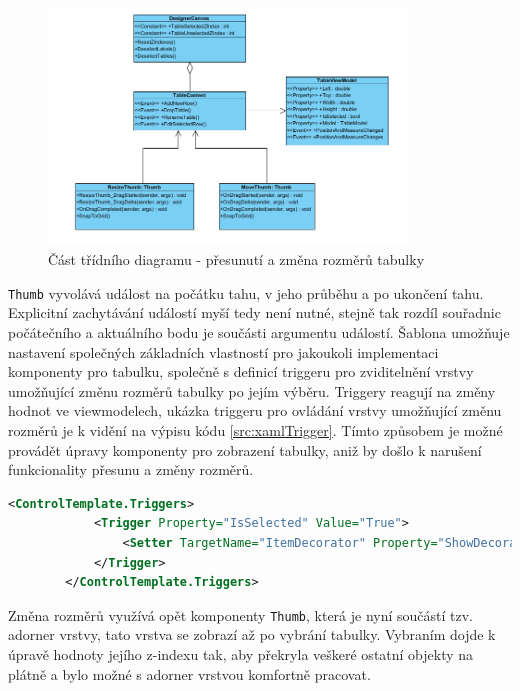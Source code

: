 \documentclass[czech,bachelor,public,dept460,male,oneside]{diploma}
\begin{document}
		\begin{figure}[H]
			\centering
			\includegraphics[width=0.85\textwidth]{Figures/EditorTabulky2}
			\caption{Část třídního diagramu - přesunutí a změna rozměrů tabulky}
			\label{fig:classDiagResize}
		\end{figure}
		
		 \texttt{Thumb} vyvolává událost na počátku tahu, v jeho průběhu a po ukončení tahu. Explicitní zachytávání událostí myší tedy není nutné, stejně tak rozdíl souřadnic počátečního a aktuálního bodu je součásti argumentu událostí. Šablona umožňuje nastavení společných základních vlastností pro jakoukoli implementaci komponenty pro tabulku, společně s definicí triggeru pro zviditelnění vrstvy umožňující změnu rozměrů tabulky po jejím výběru. Triggery reagují na změny hodnot ve viewmodelech, ukázka triggeru pro ovládání vrstvy umožňující změnu rozměrů je k vidění na výpisu kódu \ref{src:xamlTrigger}. Tímto způsobem je možné provádět úpravy komponenty pro zobrazení tabulky, aniž by došlo k narušení funkcionality přesunu a změny rozměrů. 
		
		\newpage
		\begin{lstlisting}[language=xml,label=src:xamlTrigger,caption=Příklad triggeru v XAML pro vrstvu umožňující změnu rozměrů]
		<ControlTemplate.Triggers>
			<Trigger Property="IsSelected" Value="True">
				<Setter TargetName="ItemDecorator" Property="ShowDecorator" Value="True"/>
			</Trigger>
		</ControlTemplate.Triggers>
		\end{lstlisting}
		
		Změna rozměrů využívá opět komponenty \texttt{Thumb}, která je nyní součástí tzv. adorner vrstvy, tato vrstva se zobrazí až po vybrání tabulky. Vybraním dojde k úpravě hodnoty jejího z-indexu tak, aby překryla veškeré ostatní objekty na plátně a bylo možné s adorner vrstvou komfortně pracovat. 
		
\end{document}
